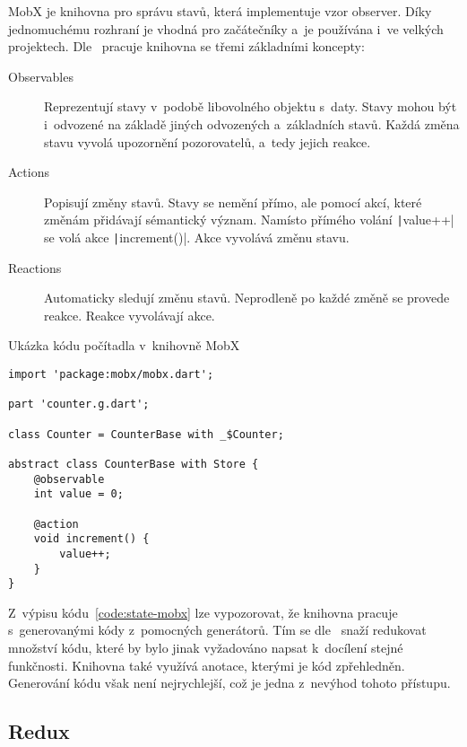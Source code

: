 MobX je knihovna pro správu stavů,
která implementuje vzor observer.
Díky jednomuchému rozhraní je vhodná pro začátečníky
a~je používána i~ve velkých projektech.
Dle~\cite{mobx_core_concepts} pracuje knihovna se třemi základními koncepty:

\begin{description}
    \item[Observables] Reprezentují stavy v~podobě libovolného objektu s~daty.
    Stavy mohou být i~odvozené na základě jiných odvozených a~základních stavů.
    Každá změna stavu vyvolá upozornění pozorovatelů, a~tedy jejich reakce.
    \item[Actions] Popisují změny stavů.
    Stavy se nemění přímo,
    ale pomocí akcí,
    které změnám přidávají sémantický význam.
    Namísto přímého volání \texttt|value++| se volá akce
    \texttt|increment()|.
    Akce vyvolává změnu stavu.
    \item[Reactions] Automaticky sledují změnu stavů.
    Neprodleně po každé změně se provede reakce.
    Reakce vyvolávají akce.
\end{description}

\begin{listing}
    \caption{Ukázka kódu počítadla v~knihovně MobX~\cite{mobx_core_concepts}}
    \label{code:state-mobx}
    \begin{verbatim}
import 'package:mobx/mobx.dart';

part 'counter.g.dart';

class Counter = CounterBase with _$Counter;

abstract class CounterBase with Store {
    @observable
    int value = 0;

    @action
    void increment() {
        value++;
    }
}
    \end{verbatim}
\end{listing}

Z~výpisu kódu~\ref{code:state-mobx} lze vypozorovat,
že knihovna pracuje s~generovanými kódy z~pomocných generátorů.
Tím se dle~\cite{mobx_core_concepts} snaží redukovat množství kódu,
které by bylo jinak vyžadováno napsat k~docílení stejné funkčnosti.
Knihovna také využívá anotace,
kterými je kód zpřehledněn.
Generování kódu však není nejrychlejší,
což je jedna z~nevýhod tohoto přístupu.

\subsection{Redux}

